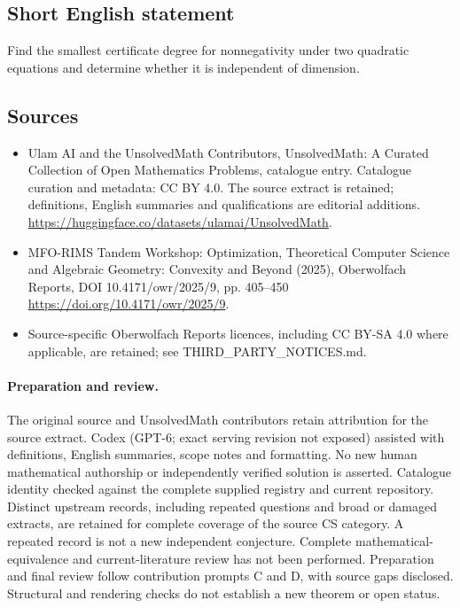\documentclass[11pt]{article}
\begin{document}
\subsection{Short English statement}
Find the smallest certificate degree for nonnegativity under two quadratic equations and determine whether it is independent of dimension.
\subsection{Sources}
\begin{itemize}
\item[\hypertarget{source:statement:1}{S1}] Ulam AI and the UnsolvedMath Contributors, UnsolvedMath: A Curated Collection of Open Mathematics Problems, catalogue entry. Catalogue curation and metadata: CC BY 4.0. The source extract is retained; definitions, English summaries and qualifications are editorial additions.
\url{https://huggingface.co/datasets/ulamai/UnsolvedMath}.
\item[\hypertarget{source:statement:2}{S2}] MFO-RIMS Tandem Workshop: Optimization, Theoretical Computer Science and Algebraic Geometry: Convexity and Beyond (2025), Oberwolfach Reports, DOI 10.4171/owr/2025/9, pp. 405--450
\url{https://doi.org/10.4171/owr/2025/9}.
\item Source-specific Oberwolfach Reports licences, including CC BY-SA 4.0 where applicable, are retained; see THIRD\_PARTY\_NOTICES.md.
\end{itemize}
\paragraph{Preparation and review.}
The original source and UnsolvedMath contributors retain attribution for the source extract. Codex (GPT-6; exact serving revision not exposed) assisted with definitions, English summaries, scope notes and formatting. No new human mathematical authorship or independently verified solution is asserted. Catalogue identity checked against the complete supplied registry and current repository. Distinct upstream records, including repeated questions and broad or damaged extracts, are retained for complete coverage of the source CS category. A repeated record is not a new independent conjecture. Complete mathematical-equivalence and current-literature review has not been performed. Preparation and final review follow contribution prompts C and D, with source gaps disclosed. Structural and rendering checks do not establish a new theorem or open status.
\label{end:statement}
\end{document}

